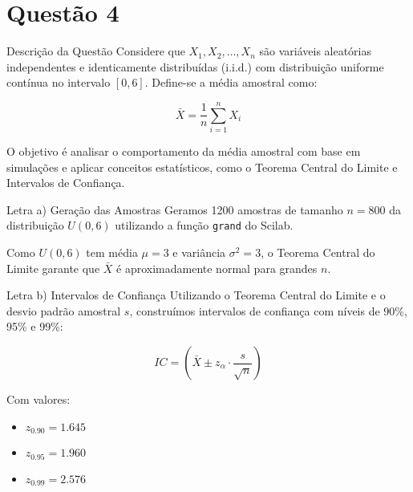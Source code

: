 \section{Questão 4}

\begin{frame}{Descrição da Questão}
Considere que $X_1, X_2, \ldots, X_n$ são variáveis aleatórias independentes e identicamente distribuídas (i.i.d.) com distribuição uniforme contínua no intervalo $[0,6]$. Define-se a média amostral como:

\[
\bar{X} = \frac{1}{n} \sum_{i=1}^{n} X_i
\]

O objetivo é analisar o comportamento da média amostral com base em simulações e aplicar conceitos estatísticos, como o Teorema Central do Limite e Intervalos de Confiança.
\end{frame}

\begin{frame}[fragile]{Letra a) Geração das Amostras}
Geramos 1200 amostras de tamanho $n = 800$ da distribuição $U(0,6)$ utilizando a função \texttt{grand} do Scilab.

\vspace{0.3em}


\vspace{0.3em}
Como $U(0,6)$ tem média $\mu = 3$ e variância $\sigma^2 = 3$, o Teorema Central do Limite garante que $\bar{X}$ é aproximadamente normal para grandes $n$.
\end{frame}

\begin{frame}[fragile]{Letra b) Intervalos de Confiança}
Utilizando o Teorema Central do Limite e o desvio padrão amostral $s$, construímos intervalos de confiança com níveis de 90\%, 95\% e 99\%:

\[
IC = \left( \bar{X} \pm z_\alpha \cdot \frac{s}{\sqrt{n}} \right)
\]

\vspace{0.3em}


\vspace{0.3em}
Com valores:
\begin{itemize}
  \item $z_{0.90} = 1.645$
  \item $z_{0.95} = 1.960$
  \item $z_{0.99} = 2.576$
\end{itemize}
\end{frame}

